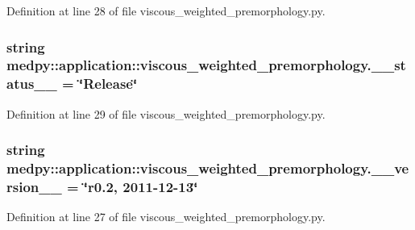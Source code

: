 Definition at line 28 of file viscous\_\-weighted\_\-premorphology.py.

\hypertarget{namespacemedpy_1_1application_1_1viscous__weighted__premorphology_a89cb4a3009d7fd6a5487431d91396344}{
\subsubsection[{\_\-\_\-status\_\-\_\-}]{\setlength{\rightskip}{0pt plus 5cm}string {\bf medpy::application::viscous\_\-weighted\_\-premorphology.\_\-\_\-status\_\-\_\-} = \char`\"{}Release\char`\"{}}}
\label{namespacemedpy_1_1application_1_1viscous__weighted__premorphology_a89cb4a3009d7fd6a5487431d91396344}


Definition at line 29 of file viscous\_\-weighted\_\-premorphology.py.

\hypertarget{namespacemedpy_1_1application_1_1viscous__weighted__premorphology_a025df249e01a30e56dc404fa6eb462a0}{
\subsubsection[{\_\-\_\-version\_\-\_\-}]{\setlength{\rightskip}{0pt plus 5cm}string {\bf medpy::application::viscous\_\-weighted\_\-premorphology.\_\-\_\-version\_\-\_\-} = \char`\"{}r0.2, 2011-\/12-\/13\char`\"{}}}
\label{namespacemedpy_1_1application_1_1viscous__weighted__premorphology_a025df249e01a30e56dc404fa6eb462a0}


Definition at line 27 of file viscous\_\-weighted\_\-premorphology.py.

